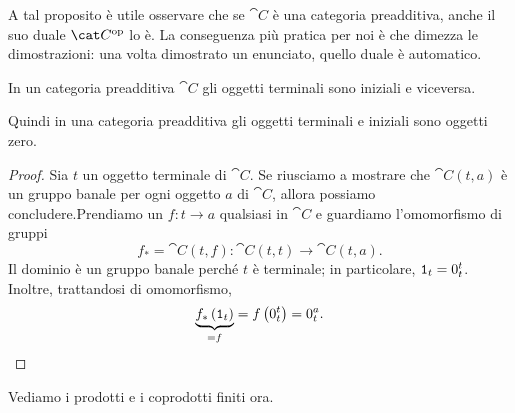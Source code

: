 \begin{remark}
  A tal proposito è utile osservare che se \(\cat C\) è una categoria
  preadditiva, anche il suo duale \(\opcat C\) lo è. La conseguenza più
  pratica per noi è che dimezza le dimostrazioni: una volta dimostrato
  un enunciato, quello duale è automatico.
\end{remark}

\begin{proposition}
  In un categoria preadditiva \(\cat C\) gli oggetti terminali sono
  iniziali e viceversa.
\end{proposition}

Quindi in una categoria preadditiva gli oggetti terminali e iniziali
sono oggetti zero.

\begin{proof}
  Sia \(t\) un oggetto terminale di \(\cat C\). Se riusciamo a
  mostrare che \(\cat C(t, a)\) è un gruppo banale per ogni oggetto
  \(a\) di \(\cat C\), allora possiamo concludere.\newline Prendiamo un
  \(f : t \to a\) qualsiasi in \(\cat C\) e guardiamo l'omomorfismo di
  gruppi
  \[
    f_\ast = \cat C(t, f) : \cat C(t, t) \to \cat C(t, a) .
  \]
  Il dominio è un gruppo banale perché \(t\) è terminale; in
  particolare, \(\mathtt 1_t = 0_t^t\). Inoltre, trattandosi di omomorfismo,
  \[
    \underbrace{f_\ast \left(\id_t\right)}_{= f} = f\left(0_t^t\right) =
    0_t^a . \qedhere
  \]
\end{proof}

Vediamo i prodotti e i coprodotti finiti ora.

